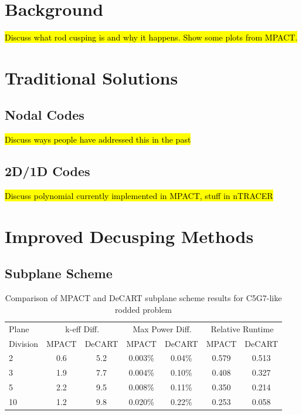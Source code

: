 \section{Background}

\hl{Discuss what rod cusping is and why it happens.  Show some plots from MPACT.}

\section{Traditional Solutions}

\subsection{Nodal Codes}

\hl{Discuss ways people have addressed this in the past}

\subsection{2D/1D Codes}

\hl{Discuss polynomial currently implemented in MPACT, stuff in nTRACER}

\section{Improved Decusping Methods}

\subsection{Subplane Scheme}


\begin{table}
\caption{Comparison of MPACT and DeCART subplane scheme results for C5G7-like rodded problem}
\begin{center}
\begin{tabular}{|l|c|c|c|c|c|c|}\hline
Plane & \multicolumn{2}{|c|}{k-eff Diff.} & \multicolumn{2}{|c|}{Max Power Diff.} & \multicolumn{2}{|c|}{Relative Runtime} \\ \cline{2-7}
Division & MPACT & DeCART & MPACT & DeCART & MPACT & DeCART \\ \hline
2 & 0.6 & 5.2 & 0.003\% & 0.04\% & 0.579 & 0.513 \\ \hline
3 & 1.9 & 7.7 & 0.004\% & 0.10\% & 0.408 & 0.327 \\ \hline
5 & 2.2 & 9.5 & 0.008\% & 0.11\% & 0.350 & 0.214 \\ \hline
10 & 1.2 & 9.8 & 0.020\% & 0.22\% & 0.253 & 0.058 \\ \hline
\end{tabular}
\end{center}
\end{table}

